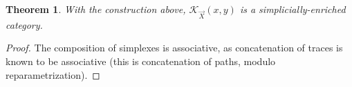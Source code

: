 \documentclass[a4paper,fleqn]{cas-sc}
\newtheorem{thm}{Theorem}%
\newcommand{\K}{\mathcal{K}}
\begin{document}
\begin{thm}
\label{thm:21}
With the construction above, $\K_{\Vec{X}} (x,y)$ is a simplicially-enriched category.
\end{thm}

\begin{proof}
The composition of simplexes is associative, as concatenation of traces is known to be associative (this is concatenation of paths, modulo reparametrization). 
\end{proof}




\end{document}
